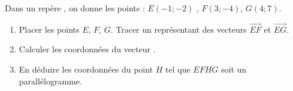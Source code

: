 
Dans un repère \Oij, on donne les points :	$E(-1;-2)$ , $F(3;-4)$, $G(4;7)$.
\begin{enumerate}
\item Placer les points $E$, $F$, $G$. Tracer un représentant des vecteurs $\overrightarrow{EF}$ et $\overrightarrow{EG}$.
\item  Calculer les coordonnées du vecteur .
\item  En déduire les coordonnées du point $H$ tel que $EFHG$ soit un parallélogramme.
\end{enumerate}